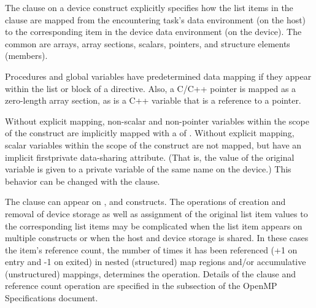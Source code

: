 The  clause on a device construct explicitly specifies how the list items in
the clause are mapped from the encountering task's data environment (on the host)
to the corresponding item in the device data environment (on the device).
The common  are arrays, array sections, scalars, pointers, and
structure elements (members). 

Procedures and global variables have predetermined data mapping if they appear
within the list or block of a  directive. Also, a C/C++ pointer
is mapped as a zero-length array section, as is a C++ variable that is a reference to a pointer.

Without explicit mapping, non-scalar and non-pointer variables within the scope of the 
construct are implicitly mapped with a  of .
Without explicit mapping, scalar variables within the scope of the 
construct are not mapped, but have an implicit firstprivate data-sharing
attribute. (That is, the value of the original variable is given to a private
variable of the same name on the device.) This behavior can be changed with
the  clause.

The  clause can appear on ,  and 
 constructs.  The operations of creation and
removal of device storage as well as assignment of the original list item 
values to the corresponding list items may be complicated when the list 
item appears on multiple constructs or when the host and device storage 
is shared. In these cases the item's reference count, the number of times
it has been referenced (+1 on entry and -1 on exited) in nested (structured)
map regions and/or accumulative (unstructured) mappings, determines the operation.
Details of the  clause and reference count operation are specified 
in the  subsection of the OpenMP Specifications document.


















